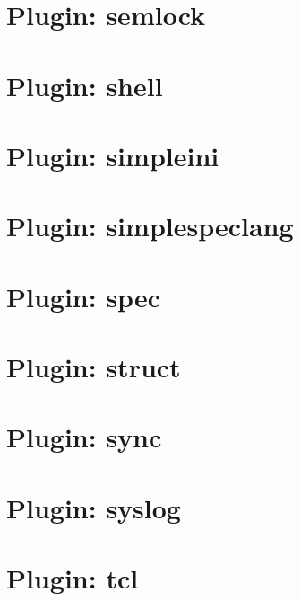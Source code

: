 \documentclass[twoside]{book}
\newcommand{\+}{\discretionary{\mbox{\scriptsize$\hookleftarrow$}}{}{}}
\begin{document}
\chapter{Plugin\+: semlock}
\label{md_src_plugins_semlock_README}
\hypertarget{md_src_plugins_semlock_README}{}

\chapter{Plugin\+: shell}
\label{md_src_plugins_shell_README}
\hypertarget{md_src_plugins_shell_README}{}

\chapter{Plugin\+: simpleini}
\label{md_src_plugins_simpleini_README}
\hypertarget{md_src_plugins_simpleini_README}{}

\chapter{Plugin\+: simplespeclang}
\label{md_src_plugins_simplespeclang_README}
\hypertarget{md_src_plugins_simplespeclang_README}{}

\chapter{Plugin\+: spec}
\label{md_src_plugins_spec_README}
\hypertarget{md_src_plugins_spec_README}{}

\chapter{Plugin\+: struct}
\label{md_src_plugins_struct_README}
\hypertarget{md_src_plugins_struct_README}{}

\chapter{Plugin\+: sync}
\label{md_src_plugins_sync_README}
\hypertarget{md_src_plugins_sync_README}{}

\chapter{Plugin\+: syslog}
\label{md_src_plugins_syslog_README}
\hypertarget{md_src_plugins_syslog_README}{}

\chapter{Plugin\+: tcl}
\label{md_src_plugins_tcl_README}
\hypertarget{md_src_plugins_tcl_README}{}

\end{document}
